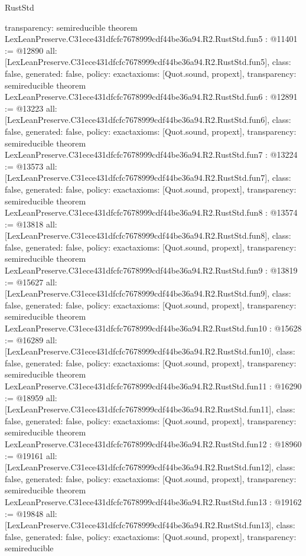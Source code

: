 \begin{lexlean}{RustStd}
\begin{coremodule}
{  transparency: semireducible
}
theorem LexLeanPreserve.C31ece431dfcfc7678999cdf44be36a94.R2.RustStd.fun5 : @11401 := @12890 {
  all: [LexLeanPreserve.C31ece431dfcfc7678999cdf44be36a94.R2.RustStd.fun5],
  class: false,
  generated: false,
  policy: exact{axioms: [Quot.sound, propext]},
  transparency: semireducible
}
theorem LexLeanPreserve.C31ece431dfcfc7678999cdf44be36a94.R2.RustStd.fun6 : @12891 := @13223 {
  all: [LexLeanPreserve.C31ece431dfcfc7678999cdf44be36a94.R2.RustStd.fun6],
  class: false,
  generated: false,
  policy: exact{axioms: [Quot.sound, propext]},
  transparency: semireducible
}
theorem LexLeanPreserve.C31ece431dfcfc7678999cdf44be36a94.R2.RustStd.fun7 : @13224 := @13573 {
  all: [LexLeanPreserve.C31ece431dfcfc7678999cdf44be36a94.R2.RustStd.fun7],
  class: false,
  generated: false,
  policy: exact{axioms: [Quot.sound, propext]},
  transparency: semireducible
}
theorem LexLeanPreserve.C31ece431dfcfc7678999cdf44be36a94.R2.RustStd.fun8 : @13574 := @13818 {
  all: [LexLeanPreserve.C31ece431dfcfc7678999cdf44be36a94.R2.RustStd.fun8],
  class: false,
  generated: false,
  policy: exact{axioms: [Quot.sound, propext]},
  transparency: semireducible
}
theorem LexLeanPreserve.C31ece431dfcfc7678999cdf44be36a94.R2.RustStd.fun9 : @13819 := @15627 {
  all: [LexLeanPreserve.C31ece431dfcfc7678999cdf44be36a94.R2.RustStd.fun9],
  class: false,
  generated: false,
  policy: exact{axioms: [Quot.sound, propext]},
  transparency: semireducible
}
theorem LexLeanPreserve.C31ece431dfcfc7678999cdf44be36a94.R2.RustStd.fun10 : @15628 := @16289 {
  all: [LexLeanPreserve.C31ece431dfcfc7678999cdf44be36a94.R2.RustStd.fun10],
  class: false,
  generated: false,
  policy: exact{axioms: [Quot.sound, propext]},
  transparency: semireducible
}
theorem LexLeanPreserve.C31ece431dfcfc7678999cdf44be36a94.R2.RustStd.fun11 : @16290 := @18959 {
  all: [LexLeanPreserve.C31ece431dfcfc7678999cdf44be36a94.R2.RustStd.fun11],
  class: false,
  generated: false,
  policy: exact{axioms: [Quot.sound, propext]},
  transparency: semireducible
}
theorem LexLeanPreserve.C31ece431dfcfc7678999cdf44be36a94.R2.RustStd.fun12 : @18960 := @19161 {
  all: [LexLeanPreserve.C31ece431dfcfc7678999cdf44be36a94.R2.RustStd.fun12],
  class: false,
  generated: false,
  policy: exact{axioms: [Quot.sound, propext]},
  transparency: semireducible
}
theorem LexLeanPreserve.C31ece431dfcfc7678999cdf44be36a94.R2.RustStd.fun13 : @19162 := @19848 {
  all: [LexLeanPreserve.C31ece431dfcfc7678999cdf44be36a94.R2.RustStd.fun13],
  class: false,
  generated: false,
  policy: exact{axioms: [Quot.sound, propext]},
  transparency: semireducible
}
\end{coremodule}
\end{lexlean}
